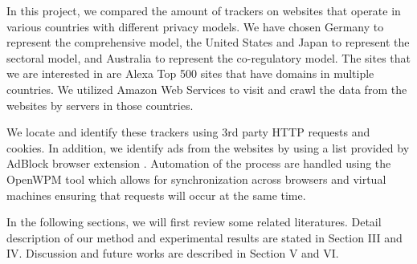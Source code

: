 \documentclass[12pt,draft,onecolumn]{IEEEtran}
\begin{document}
In this project, we compared the amount of trackers on websites that operate in various countries with different privacy models. We have chosen Germany to represent the comprehensive model, the United States and Japan to represent the sectoral model, and Australia to represent the co-regulatory model. The sites that we are interested in are Alexa Top 500 sites \cite{Alexa} that have domains in multiple countries. We utilized Amazon Web Services to visit and crawl the data from the websites by servers in those countries. 

We locate and identify these trackers using 3rd party HTTP requests and cookies. In addition, we identify ads from the websites by using a list provided by AdBlock browser extension \cite{adblock}. Automation of the process are handled using the OpenWPM \cite{openwpm} tool which allows for synchronization across browsers and virtual machines ensuring that requests will occur at the same time. 

In the following sections, we will first review some related literatures. Detail description of our method and experimental results are stated in Section III and IV. Discussion and future works are described in Section V and VI.







%
%
\end{document}
